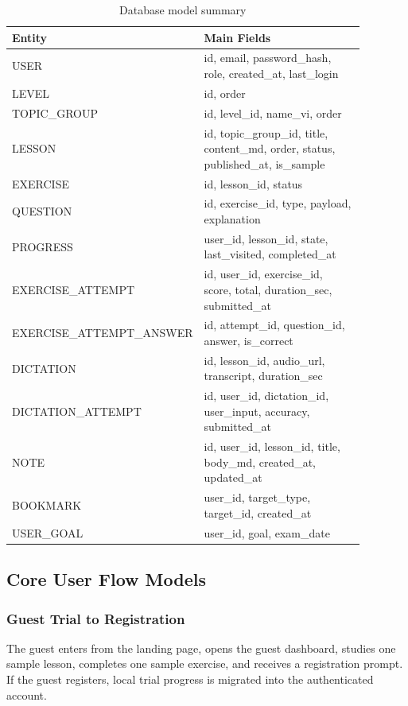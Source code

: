 \begin{longtable}{p{0.22\linewidth} p{0.66\linewidth}}
\caption{Database model summary}\\
\toprule
Entity & Main Fields \\
\midrule
\endhead
USER & id, email, password\_hash, role, created\_at, last\_login \\
LEVEL & id, order \\
TOPIC\_GROUP & id, level\_id, name\_vi, order \\
LESSON & id, topic\_group\_id, title, content\_md, order, status, published\_at, is\_sample \\
EXERCISE & id, lesson\_id, status \\
QUESTION & id, exercise\_id, type, payload, explanation \\
PROGRESS & user\_id, lesson\_id, state, last\_visited, completed\_at \\
EXERCISE\_ATTEMPT & id, user\_id, exercise\_id, score, total, duration\_sec, submitted\_at \\
EXERCISE\_ATTEMPT\_ANSWER & id, attempt\_id, question\_id, answer, is\_correct \\
DICTATION & id, lesson\_id, audio\_url, transcript, duration\_sec \\
DICTATION\_ATTEMPT & id, user\_id, dictation\_id, user\_input, accuracy, submitted\_at \\
NOTE & id, user\_id, lesson\_id, title, body\_md, created\_at, updated\_at \\
BOOKMARK & user\_id, target\_type, target\_id, created\_at \\
USER\_GOAL & user\_id, goal, exam\_date \\
\bottomrule
\end{longtable}


\subsection{Core User Flow Models}

\subsubsection{Guest Trial to Registration}

The guest enters from the landing page, opens the guest dashboard, studies one sample lesson, completes one sample exercise, and receives a registration prompt. If the guest registers, local trial progress is migrated into the authenticated account.


